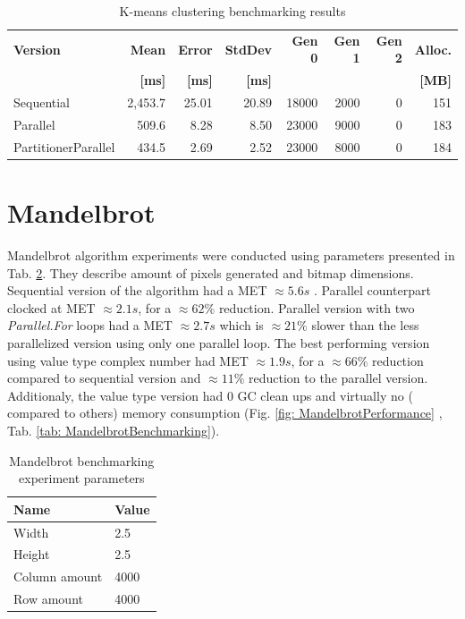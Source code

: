 \begin{table}[ht]%
    \centering
    \caption{K-means clustering benchmarking results}
		\label{tab: KMeansBenchmarking}
    \begin{tabularx}{\linewidth}{Xrrrrrrr} 
		\toprule
		\toprule
			\bfseries Version 		&
			\bfseries Mean 	      &
			\bfseries Error       &
			\bfseries StdDev 	    &
			\bfseries Gen 0	    	&
			\bfseries Gen 1	    	&
			\bfseries Gen 2	    	&
			\bfseries Alloc.      \\ 
			&
			\bfseries {[}ms{]} &
			\bfseries {[}ms{]} &
			\bfseries {[}ms{]} &
			&
			&
			&
			\bfseries{[}MB{]} \\	
			\midrule 
Sequential & 2,453.7 	& 25.01	& 20.89	& 18000 & 	2000 & 	0 & 151  \\
Parallel & 509.6 	& 8.28 	& 8.50 	& 23000 & 	9000 & 	0 & 183  \\ 
PartitionerParallel & 434.5 	& 2.69 	& 2.52 	& 23000 & 	8000 & 	0 & 184  \\
			\bottomrule
		\end{tabularx}
\end{table}

\clearpage
\section{Mandelbrot}
\label{sec: Mandelbrot}
Mandelbrot algorithm experiments were conducted using parameters presented in 
Tab. \ref{tab: MandelbrotParameters}. They describe amount of pixels 
generated and bitmap dimensions.
Sequential version of the algorithm had a MET  $\approx 5.6s$ . Parallel 
counterpart clocked at MET  $\approx 2.1s$, for a $\approx 62\%$ reduction. 
Parallel version with two \emph{Parallel.For} loops had a MET $\approx 2.7s$ 
which is $\approx 21\%$ slower than the less parallelized version using only 
one parallel loop. The best performing version using value type complex 
number had MET $\approx 1.9s$, for a $\approx 66\%$  reduction compared to 
sequential version and $\approx 11\%$  reduction to the parallel version. 
Additionaly, the value type version had 0 GC clean ups and virtually no (
compared to others) memory consumption (Fig. \ref{fig: MandelbrotPerformance}
, Tab. \ref{tab: MandelbrotBenchmarking}).

\begin{table}[!ht]
    \centering
    \caption{Mandelbrot benchmarking experiment parameters}
		\label{tab: MandelbrotParameters}
    \begin{tabular}{p{3cm}p{3cm}}
			\toprule
			\bfseries Name 	&
			\bfseries Value \\
			\midrule
			Width & 2.5 \\
			Height & 2.5 \\
			Column amount & 4000 \\ 
			Row amount  & 4000 \\	
			\bottomrule
    \end{tabular}
\end{table}

